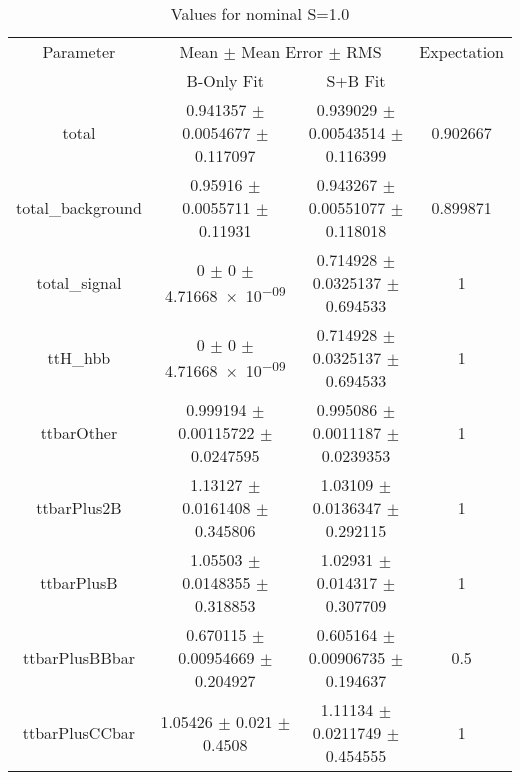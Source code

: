 \begin{table}
\centering
\caption{Values for nominal S=1.0}
\begin{tabular}{cccc}
\toprule
Parameter & \multicolumn{2}{c}{Mean $\pm$ Mean Error $\pm$ RMS} & Expectation\\
 & B-Only Fit & S+B Fit & \\
\midrule
total & \num{0.941357} $\pm$ \num{0.0054677} $\pm$ \num{0.117097} & \num{0.939029} $\pm$ \num{0.00543514} $\pm$ \num{0.116399} & \num{0.902667}\\
total\_background & \num{0.95916} $\pm$ \num{0.0055711} $\pm$ \num{0.11931} & \num{0.943267} $\pm$ \num{0.00551077} $\pm$ \num{0.118018} & \num{0.899871}\\
total\_signal & \num{0} $\pm$ \num{0} $\pm$ \num{4.71668e-09} & \num{0.714928} $\pm$ \num{0.0325137} $\pm$ \num{0.694533} & \num{1}\\
ttH\_hbb & \num{0} $\pm$ \num{0} $\pm$ \num{4.71668e-09} & \num{0.714928} $\pm$ \num{0.0325137} $\pm$ \num{0.694533} & \num{1}\\
ttbarOther & \num{0.999194} $\pm$ \num{0.00115722} $\pm$ \num{0.0247595} & \num{0.995086} $\pm$ \num{0.0011187} $\pm$ \num{0.0239353} & \num{1}\\
ttbarPlus2B & \num{1.13127} $\pm$ \num{0.0161408} $\pm$ \num{0.345806} & \num{1.03109} $\pm$ \num{0.0136347} $\pm$ \num{0.292115} & \num{1}\\
ttbarPlusB & \num{1.05503} $\pm$ \num{0.0148355} $\pm$ \num{0.318853} & \num{1.02931} $\pm$ \num{0.014317} $\pm$ \num{0.307709} & \num{1}\\
ttbarPlusBBbar & \num{0.670115} $\pm$ \num{0.00954669} $\pm$ \num{0.204927} & \num{0.605164} $\pm$ \num{0.00906735} $\pm$ \num{0.194637} & \num{0.5}\\
ttbarPlusCCbar & \num{1.05426} $\pm$ \num{0.021} $\pm$ \num{0.4508} & \num{1.11134} $\pm$ \num{0.0211749} $\pm$ \num{0.454555} & \num{1}\\
\bottomrule
\end{tabular}
\end{table}